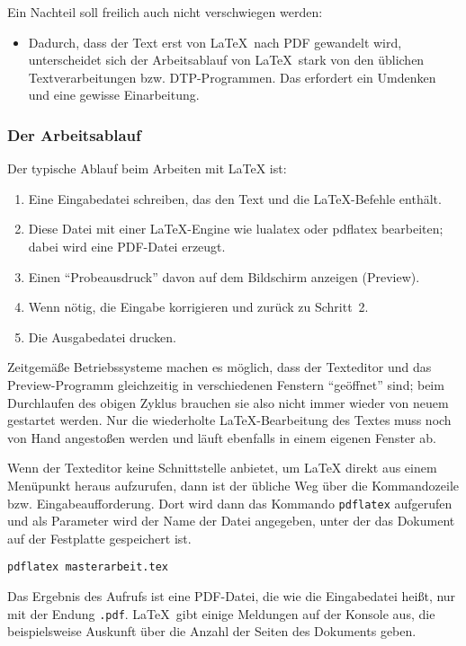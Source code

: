 Ein Nachteil soll freilich auch nicht verschwiegen werden:
\begin{itemize}
\item Dadurch, dass der Text erst von \LaTeX\ nach PDF gewandelt wird, unterscheidet sich der Arbeitsablauf von \LaTeX\ stark von den üblichen Textverarbeitungen bzw. DTP-Programmen. Das erfordert ein Umdenken und eine gewisse Einarbeitung.
\end{itemize}

\subsubsection{Der Arbeitsablauf}
Der typische Ablauf beim Arbeiten mit \LaTeX{} ist:
\begin{enumerate}
  \item Eine Eingabedatei schreiben, das den Text und die \LaTeX-Befehle 
  enthält.
  \item Diese Datei mit einer \LaTeX-Engine wie lualatex oder pdflatex bearbeiten; dabei wird eine PDF-Datei erzeugt.
  \item Einen \enquote{Probeausdruck} davon auf dem Bildschirm anzeigen (Preview).
  \item Wenn nötig, die Eingabe korrigieren und zurück zu Schritt~2.
  \item Die Ausgabedatei drucken.
\end{enumerate}
Zeitgemäße Betriebssysteme machen es möglich, dass der Texteditor
und das Preview-Programm gleichzeitig in verschiedenen Fenstern 
\enquote{geöffnet} sind; beim Durchlaufen des obigen Zyklus brauchen sie 
also nicht immer wieder von neuem gestartet werden.  Nur die 
wiederholte \LaTeX-Bearbeitung des Textes muss noch von Hand 
angestoßen werden und läuft ebenfalls in einem eigenen Fenster ab.

Wenn der Texteditor keine Schnittstelle anbietet, um \LaTeX{} direkt aus einem Menüpunkt heraus aufzurufen, dann ist der übliche Weg über die Kommandozeile bzw. Eingabeaufforderung. Dort wird dann das Kommando \texttt{pdflatex} aufgerufen und als Parameter wird der Name der Datei angegeben, unter der das Dokument auf der Festplatte gespeichert ist.

\begin{beispiel}
  \texttt{pdflatex masterarbeit.tex}
\end{beispiel}
Das Ergebnis des Aufrufs ist eine PDF-Datei, die wie die Eingabedatei heißt, nur mit der Endung \texttt{.pdf}. \LaTeX\ gibt einige Meldungen auf der Konsole aus, die beispielsweise Auskunft über die Anzahl der Seiten des Dokuments geben.

